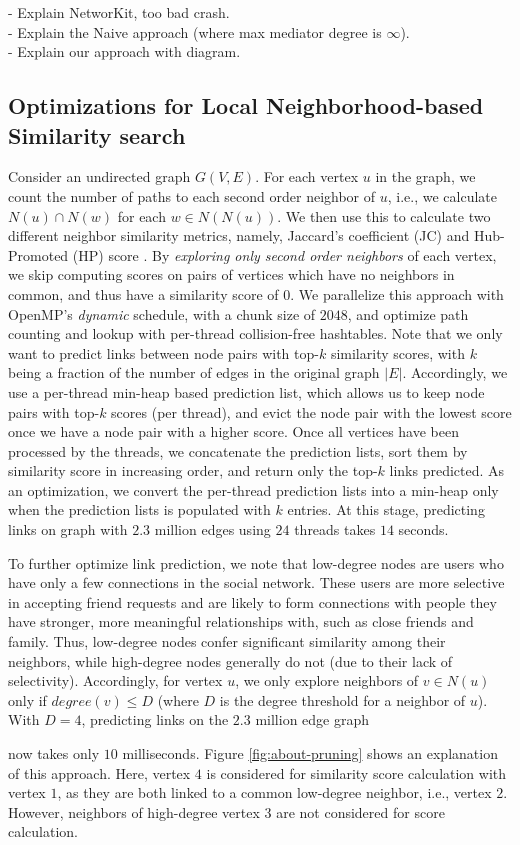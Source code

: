 - Explain NetworKit, too bad crash. \\
- Explain the Naive approach (where max mediator degree is $\infty$). \\
- Explain our approach with diagram.




\subsection{Optimizations for Local Neighborhood-based Similarity search}
\label{sec:leiden}

Consider an undirected graph $G(V, E)$. For each vertex $u$ in the graph, we count the number of paths to each second order neighbor of $u$, i.e., we calculate $N(u) \cap N(w)$ for each $w \in N(N(u))$. We then use this to calculate two different neighbor similarity metrics, namely, Jaccard's coefficient (JC) and Hub-Promoted (HP) score \cite{gatadi2023lpcd}. By \textit{exploring only second order neighbors} of each vertex, we skip computing scores on pairs of vertices which have no neighbors in common, and thus have a similarity score of $0$. We parallelize this approach with OpenMP's \textit{dynamic} schedule, with a chunk size of $2048$, and optimize path counting and lookup with per-thread collision-free hashtables. Note that we only want to predict links between node pairs with top-$k$ similarity scores, with $k$ being a fraction of the number of edges in the original graph $|E|$. Accordingly, we use a per-thread min-heap based prediction list, which allows us to keep node pairs with top-$k$ scores (per thread), and evict the node pair with the lowest score once we have a node pair with a higher score. Once all vertices have been processed by the threads, we concatenate the prediction lists, sort them by similarity score in increasing order, and return only the top-$k$ links predicted. As an optimization, we convert the per-thread prediction lists into a min-heap only when the prediction lists is populated with $k$ entries. At this stage, predicting links on graph with $2.3$ million edges using $24$ threads takes $14$ seconds.

To further optimize link prediction, we note that low-degree nodes are users who have only a few connections in the social network. These users are more selective in accepting friend requests and are likely to form connections with people they have stronger, more meaningful relationships with, such as close friends and family. Thus, low-degree nodes confer significant similarity among their neighbors, while high-degree nodes generally do not (due to their lack of selectivity). Accordingly, for vertex $u$, we only explore neighbors of $v \in N(u)$ only if $degree(v) \leq D$ (where $D$ is the degree threshold for a neighbor of $u$). With $D = 4$, predicting links on the $2.3$ million edge graph now takes only $10$ milliseconds. Figure \ref{fig:about-pruning} shows an explanation of this approach. Here, vertex $4$ is considered for similarity score calculation with vertex $1$, as they are both linked to a common low-degree neighbor, i.e., vertex $2$. However, neighbors of high-degree vertex $3$ are not considered for score calculation.


